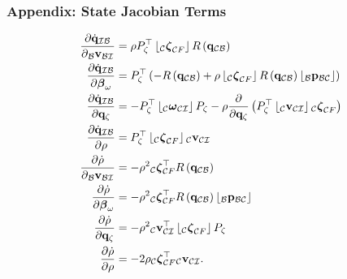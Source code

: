 \documentclass{beamer}
\begin{document}
\begin{frame}
\frametitle{Appendix: State Jacobian Terms}
\begin{align}
\dfrac{\partial\dot{{\bf q}}_{\mathcal{I}\mathcal{B}}}{\partial{}_{\mathcal{B}}{\bf v}_{\mathcal{B}\mathcal{I}}} & =\rho P_{\zeta}^{\top}\left\lfloor _{\mathcal{C}}\boldsymbol{\zeta}_{\mathcal{C}F}\right\rfloor R\left({\bf q}_{\mathcal{C}\mathcal{B}}\right)\\
\dfrac{\partial\dot{{\bf q}}_{\mathcal{I}\mathcal{B}}}{\partial\boldsymbol{\beta}_{\omega}} & =P_{\zeta}^{\top}\left(-R\left({\bf q}_{\mathcal{C}\mathcal{B}}\right)+\rho\left\lfloor _{\mathcal{C}}\boldsymbol{\zeta}_{\mathcal{C}F}\right\rfloor R\left({\bf q}_{\mathcal{C}\mathcal{B}}\right)\left\lfloor _{\mathcal{B}}{\bf p}_{\mathcal{B}\mathcal{C}}\right\rfloor \right)\\
\dfrac{\partial\dot{{\bf q}}_{\mathcal{I}\mathcal{B}}}{\partial{\bf q}_{\zeta}} & =-P_{\zeta}^{\top}\left\lfloor _{\mathcal{C}}\boldsymbol{\omega}_{\mathcal{C}\mathcal{I}}\right\rfloor P_{\zeta}-\rho\dfrac{\partial}{\partial{\bf q}_{\zeta}}\left(P_{\zeta}^{\top}\left\lfloor _{\mathcal{C}}{\bf v}_{\mathcal{C}\mathcal{I}}\right\rfloor {}_{\mathcal{C}}\boldsymbol{\zeta}_{\mathcal{C}F}\right)\\
\dfrac{\partial\dot{{\bf q}}_{\mathcal{I}\mathcal{B}}}{\partial\rho} & =P_{\zeta}^{\top}\left\lfloor _{\mathcal{C}}\boldsymbol{\zeta}_{\mathcal{C}F}\right\rfloor {}_{\mathcal{C}}{\bf v}_{\mathcal{C}\mathcal{I}}\\
\dfrac{\partial\dot{\rho}}{\partial{}_{\mathcal{B}}{\bf v}_{\mathcal{B}\mathcal{I}}} & =-\rho^{2}{}_{\mathcal{C}}\boldsymbol{\zeta}_{\mathcal{C}F}^{\top}R\left({\bf q}_{\mathcal{C}\mathcal{B}}\right)\\
\dfrac{\partial\dot{\rho}}{\partial\boldsymbol{\beta}_{\omega}} & =-\rho^{2}{}_{\mathcal{C}}\boldsymbol{\zeta}_{\mathcal{C}F}^{\top}R\left({\bf q}_{\mathcal{C}\mathcal{B}}\right)\left\lfloor _{\mathcal{B}}{\bf p}_{\mathcal{B}\mathcal{C}}\right\rfloor \\
\dfrac{\partial\dot{\rho}}{\partial{\bf q}_{\zeta}} & =-\rho^{2}{}_{\mathcal{C}}{\bf v}_{\mathcal{C}\mathcal{I}}^{\top}\left\lfloor _{\mathcal{C}}\boldsymbol{\zeta}_{\mathcal{C}F}\right\rfloor P_{\zeta}\\
\dfrac{\partial\dot{\rho}}{\partial\rho} & =-2\rho{}_{\mathcal{C}}\boldsymbol{\zeta}_{\mathcal{C}F}^{\top}{}_{\mathcal{C}}{\bf v}_{\mathcal{C}\mathcal{I}}.
\end{align}
\end{frame}
\end{document}
